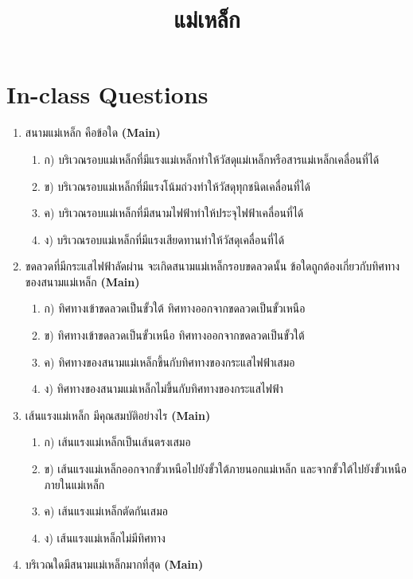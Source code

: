\documentclass[12pt]{article}
\begin{document}
\title{แม่เหล็ก}
\maketitle
\section*{In-class Questions}
\begin{enumerate}[label=\arabic*.]
\item สนามแม่เหล็ก คือข้อใด \hfill \textbf{\small (Main)}
\begin{enumerate}[label=)]
\item ก) บริเวณรอบแม่เหล็กที่มีแรงแม่เหล็กทำให้วัสดุแม่เหล็กหรือสารแม่เหล็กเคลื่อนที่ได้
\item ข) บริเวณรอบแม่เหล็กที่มีแรงโน้มถ่วงทำให้วัสดุทุกชนิดเคลื่อนที่ได้
\item ค) บริเวณรอบแม่เหล็กที่มีสนามไฟฟ้าทำให้ประจุไฟฟ้าเคลื่อนที่ได้
\item ง) บริเวณรอบแม่เหล็กที่มีแรงเสียดทานทำให้วัสดุเคลื่อนที่ได้
\end{enumerate}
\item ขดลวดที่มีกระแสไฟฟ้าลัดผ่าน จะเกิดสนามแม่เหล็กรอบขดลวดนั้น ข้อใดถูกต้องเกี่ยวกับทิศทางของสนามแม่เหล็ก \hfill \textbf{\small (Main)}
\begin{enumerate}[label=)]
\item ก) ทิศทางเข้าขดลวดเป็นขั้วใต้ ทิศทางออกจากขดลวดเป็นขั้วเหนือ
\item ข) ทิศทางเข้าขดลวดเป็นขั้วเหนือ ทิศทางออกจากขดลวดเป็นขั้วใต้
\item ค) ทิศทางของสนามแม่เหล็กขึ้นกับทิศทางของกระแสไฟฟ้าเสมอ
\item ง) ทิศทางของสนามแม่เหล็กไม่ขึ้นกับทิศทางของกระแสไฟฟ้า
\end{enumerate}
\item เส้นแรงแม่เหล็ก มีคุณสมบัติอย่างไร \hfill \textbf{\small (Main)}
\begin{enumerate}[label=)]
\item ก) เส้นแรงแม่เหล็กเป็นเส้นตรงเสมอ
\item ข) เส้นแรงแม่เหล็กออกจากขั้วเหนือไปยังขั้วใต้ภายนอกแม่เหล็ก และจากขั้วใต้ไปยังขั้วเหนือภายในแม่เหล็ก
\item ค) เส้นแรงแม่เหล็กตัดกันเสมอ
\item ง) เส้นแรงแม่เหล็กไม่มีทิศทาง
\end{enumerate}
\item บริเวณใดมีสนามแม่เหล็กมากที่สุด \hfill \textbf{\small (Main)}
\begin{enumerate}[label=)]

\end{enumerate}
\end{enumerate}
\end{document}
